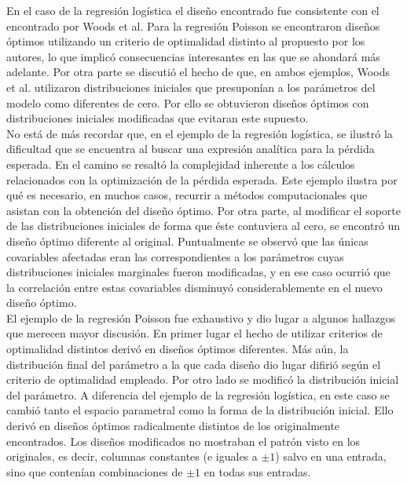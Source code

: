 En el caso de la regresión logística el diseño encontrado fue consistente con el encontrado por Woods et al. Para la regresión Poisson se encontraron diseños óptimos utilizando un criterio de optimalidad distinto al propuesto por los autores, lo que implicó consecuencias interesantes en las que se ahondará más adelante. Por otra parte se discutió el hecho de que, en ambos ejemplos, Woods et al. utilizaron distribuciones iniciales que presuponían a los parámetros del modelo como diferentes de cero. Por ello se obtuvieron diseños óptimos con distribuciones iniciales modificadas que evitaran este supuesto. \\




No está de más recordar que, en el ejemplo de la regresión logística, se ilustró la dificultad que se encuentra al buscar una expresión analítica para la pérdida esperada. En el camino se resaltó la complejidad inherente a los cálculos relacionados con la optimización de la pérdida esperada. Este ejemplo ilustra por qué es necesario, en muchos casos, recurrir a métodos computacionales que asistan con la obtención del diseño óptimo. Por otra parte, al modificar el soporte de las distribuciones iniciales de forma que éste contuviera al cero, se encontró un diseño óptimo diferente al original. Puntualmente se observó que las únicas covariables afectadas eran las correspondientes a los parámetros cuyas distribuciones iniciales marginales fueron modificadas, y en ese caso ocurrió que la correlación entre estas covariables disminuyó considerablemente en el nuevo diseño óptimo. \\


El ejemplo de la regresión Poisson fue exhaustivo y dio lugar a algunos hallazgos que merecen mayor discusión. En primer lugar el hecho de utilizar criterios de optimalidad distintos derivó en diseños óptimos diferentes. Más aún, la distribución final del parámetro a la que cada diseño dio lugar difirió según el criterio de optimalidad empleado. Por otro lado se modificó la distribución inicial del parámetro. A diferencia del ejemplo de la regresión logística, en este caso se cambió tanto el espacio parametral como la forma de la distribución inicial. Ello derivó en diseños óptimos radicalmente distintos de los originalmente encontrados. Los diseños modificados no mostraban el patrón visto en los originales, es decir, columnas constantes (e iguales a $\pm 1$) salvo en una entrada, sino que contenían combinaciones de $\pm 1$ en todas sus entradas. \\



